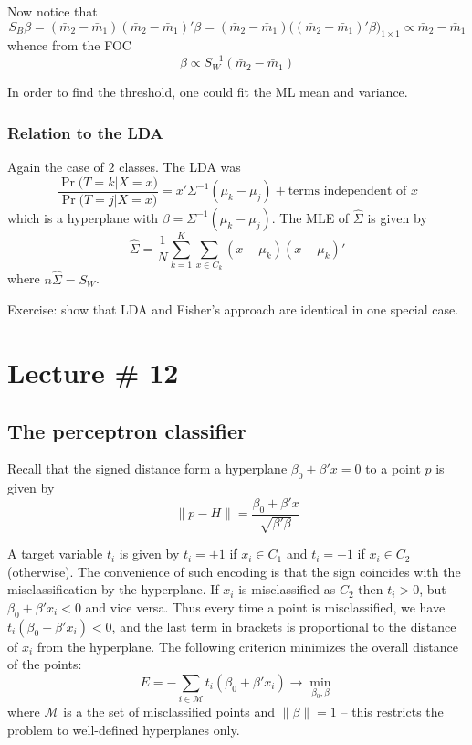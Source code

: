 \documentclass[a4paper]{article}
\newcommand{\nrm}[1]{{\left\| #1 \right \|}}
\newcommand{\Mcal}{\mathcal{M}}
\begin{document}
Now notice that
\[
S_B\beta
= (\bar{m}_2-\bar{m}_1)(\bar{m}_2-\bar{m}_1)'\beta
= (\bar{m}_2-\bar{m}_1)\bigl((\bar{m}_2-\bar{m}_1)'\beta\bigr)_{1\times 1}
\propto \bar{m}_2-\bar{m}_1
\]
whence from the FOC
\[\beta\propto S_W^{-1} (\bar{m}_2-\bar{m}_1)\]

In order to find the threshold, one could fit the ML mean and variance.


\subsubsection{Relation to the LDA} %
\label{ssub:relation_to_the_lda}

Again the case of $2$ classes. The LDA was
\[
\frac{\Pr\bigl(T=k\lvert X=x\bigr)}{\Pr\bigl(T=j\lvert X=x\bigr)}
= x'\Sigma^{-1}(\mu_k-\mu_j) + \text{terms independent of } x
\]
which is a hyperplane with $\beta = \Sigma^{-1}(\mu_k-\mu_j)$.
The MLE of $\hat{\Sigma}$ is given by
\[\hat{\Sigma} = \frac{1}{N}\sum_{k=1}^K \sum_{x\in C_k} (x - \mu_k)(x - \mu_k)'\]
where $n\hat{\Sigma} = S_W$.

Exercise: show that LDA and Fisher's approach are identical in one special case.





\section{Lecture \# 12} %
\label{sec:lecture_12}

\subsection{The perceptron classifier} %
\label{sub:perceptron}

Recall that the signed distance form a hyperplane $\beta_0 + \beta'x = 0$ to a
point $p$ is given by
\[\nrm{p-H} = \frac{\beta_0 + \beta'x}{\sqrt{\beta'\beta}}\]

A target variable $t_i$ is given by $t_i = +1$ if $x_i\in C_1$ and $t_i = -1$
if $x_i\in C_2$ (otherwise). The convenience of such encoding is that the sign
coincides with the misclassification by the hyperplane. If $x_i$ is misclassified
as $C_2$ then $t_i>0$, but $\beta_0+\beta'x_i < 0$ and vice versa. Thus every time
a point is misclassified, we have $t_i(\beta_0 +\beta'x_i) < 0$, and the last term in
brackets is proportional to the distance of $x_i$ from the hyperplane. The following
criterion minimizes the overall distance of the points:
\[
E = - \sum_{i\in \Mcal} t_i( \beta_0 + \beta'x_i ) \to \min_{\beta_0, \beta}
\]
where $\Mcal$ is a the set of misclassified points and $\|\beta\| = 1$ -- this restricts
the problem to well-defined hyperplanes only.
\end{document}
